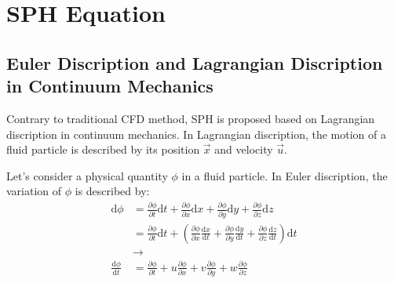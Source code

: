 \section{SPH Equation}

\subsection{Euler Discription and Lagrangian Discription in Continuum Mechanics}

Contrary to traditional CFD method, 
SPH is proposed based on Lagrangian discription in continuum mechanics.
In Lagrangian discription, 
the motion of a fluid particle is described by its position $\vec{x}$ and velocity $\vec{u}$.

Let's consider a physical quantity $\phi$ in a fluid particle. 
In Euler discription, 
the variation of $\phi$ is described by:
\begin{equation}
    \begin{aligned}
        \mathrm{d} \phi &= \frac{\partial \phi}{\partial t} \mathrm{d} t + \frac{\partial \phi}{\partial x} \mathrm{d} x + \frac{\partial \phi}{\partial y} \mathrm{d} y + \frac{\partial \phi}{\partial z} \mathrm{d} z\\
        &=
        \frac{\partial \phi}{\partial t} \mathrm{d} t +
        \left(
        \frac{\partial \phi}{\partial x} \frac{\mathrm{d} x}{\mathrm{d} t} +
        \frac{\partial \phi}{\partial y} \frac{\mathrm{d} y}{\mathrm{d} t} +
        \frac{\partial \phi}{\partial z} \frac{\mathrm{d} z}{\mathrm{d} t}
        \right) \mathrm{d} t\\
        &\rightarrow\\
        \frac{\mathrm{d} \phi}{\mathrm{d} t} &=
        \frac{\partial \phi}{\partial t} +
        u \frac{\partial \phi}{\partial x} +
        v \frac{\partial \phi}{\partial y} +
        w \frac{\partial \phi}{\partial z}
    \end{aligned}
\end{equation}

\begin{figure}[H]
    \centering
\end{figure}

